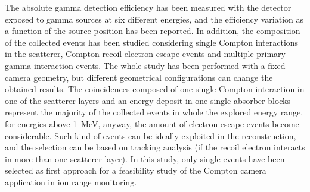 The absolute gamma detection efficiency has been measured with the detector exposed to gamma sources at six different energies, and the efficiency variation as a function of the source position has been reported. In addition, the composition of the collected events has been studied considering single Compton interactions in the scatterer, Compton recoil electron escape events and multiple primary gamma interaction events. The whole study has been performed with a fixed camera geometry, but different geometrical configurations can change the obtained results. The coincidences composed of one single Compton interaction in one of the scatterer layers and an energy deposit in one single absorber blocks represent the majority of the collected events in whole the explored energy range. for energies above 1~MeV, anyway, the amount of electron escape events become considerable. Such kind of events can be ideally exploited in the reconstruction, and the selection can be based on tracking analysis (if the recoil electron interacts in more than one scatterer layer). In this study, only single events have been selected as first approach for a feasibility study of the Compton camera application in ion range monitoring. 
